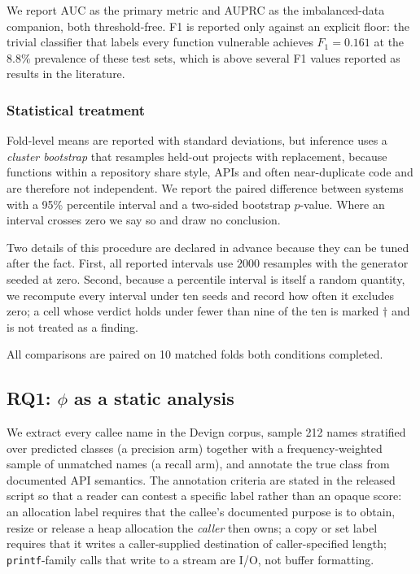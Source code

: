We report AUC as the primary metric and AUPRC as the imbalanced-data
companion, both threshold-free. F1 is reported only against an explicit floor:
the trivial classifier that labels every function vulnerable achieves
$F_1 = 0.161$ at the $8.8\%$ prevalence of these test sets, which is above
several F1 values reported as results in the literature.

\subsubsection{Statistical treatment}
Fold-level means are reported with standard deviations, but inference uses a
\emph{cluster bootstrap} that resamples held-out projects with replacement,
because functions within a repository share style, APIs and often
near-duplicate code and are therefore not independent. We report the paired
difference between systems with a 95\% percentile interval and a two-sided
bootstrap $p$-value. Where an interval crosses zero we say so and draw no
conclusion.

Two details of this procedure are declared in advance because they can be
tuned after the fact. First, all reported intervals use $2000$ resamples with
the generator seeded at zero. Second, because a percentile interval is itself a
random quantity, we recompute every interval under ten seeds and record how
often it excludes zero; a cell whose verdict holds under fewer than nine of the
ten is marked $\dagger$ and is not treated as a finding.

All comparisons are paired on 10 matched folds both conditions completed.

\subsection{RQ1: $\phi$ as a static analysis}
\label{sec:rq_analysis}

We extract every callee name in the Devign corpus, sample 212 names stratified
over predicted classes (a precision arm) together with a frequency-weighted
sample of unmatched names (a recall arm), and annotate the true class from
documented API semantics. The annotation criteria are stated in the released
script so that a reader can contest a specific label rather than an opaque
score: an allocation label requires that the callee's documented purpose is to
obtain, resize or release a heap allocation the \emph{caller} then owns; a
copy or set label requires that it writes a caller-supplied destination of
caller-specified length; \texttt{printf}-family calls that write to a stream
are I/O, not buffer formatting.


